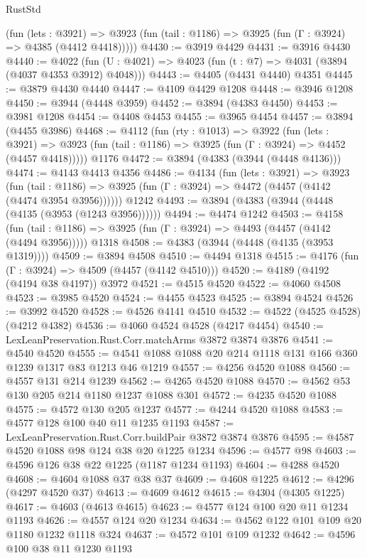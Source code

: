 \begin{lexlean}{RustStd}
\begin{coremodule}
{\begin{coremodule}
{{{{{{{{{{{{{{{{{{{{{{{{{{{{{{{{      (fun (lets : @3921) =>
      @3923 (fun (tail : @1186) => @3925 (fun (Γ : @3924) => @4385 (@4412 @4418)))))
@4430 := @3919 @4429
@4431 := @3916 @4430
@4440 := @4022 (fun (U : @4021) => @4023 (fun (t : @7) => @4031 (@3894 (@4037 @4353 @3912) @4048)))
@4443 := @4405 (@4431 @4440) @4351
@4445 := @3879 @4430 @4440
@4447 := @4109 @4429 @1208
@4448 := @3946 @1208
@4450 := @3944 (@4448 @3959)
@4452 := @3894 (@4383 @4450)
@4453 := @3981 @1208
@4454 := @4408 @4453
@4455 := @3965 @4454
@4457 := @3894 (@4455 @3986)
@4468 := @4112
    (fun (rty : @1013) =>
    @3922
      (fun (lets : @3921) =>
      @3923 (fun (tail : @1186) => @3925 (fun (Γ : @3924) => @4452 (@4457 @4418)))))
    @1176
@4472 := @3894 (@4383 (@3944 (@4448 @4136)))
@4474 := @4143 @4413 @4356
@4486 := @4134
    (fun (lets : @3921) =>
    @3923
      (fun (tail : @1186) => @3925 (fun (Γ : @3924) => @4472 (@4457 (@4142 (@4474 @3954 @3956))))))
    @1242
@4493 := @3894 (@4383 (@3944 (@4448 (@4135 (@3953 (@1243 @3956))))))
@4494 := @4474 @1242
@4503 := @4158
    (fun (tail : @1186) => @3925 (fun (Γ : @3924) => @4493 (@4457 (@4142 (@4494 @3956)))))
    @1318
@4508 := @4383 (@3944 (@4448 (@4135 (@3953 @1319))))
@4509 := @3894 @4508
@4510 := @4494 @1318
@4515 := @4176 (fun (Γ : @3924) => @4509 (@4457 (@4142 @4510)))
@4520 := @4189 (@4192 (@4194 @38 @4197)) @3972
@4521 := @4515 @4520
@4522 := @4060 @4508
@4523 := @3985 @4520
@4524 := @4455 @4523
@4525 := @3894 @4524
@4526 := @3992 @4520
@4528 := @4526 @4141 @4510
@4532 := @4522 (@4525 @4528) (@4212 @4382)
@4536 := @4060 @4524 @4528 (@4217 @4454)
@4540 := LexLeanPreservation.Rust.Corr.matchArms @3872 @3874 @3876
@4541 := @4540 @4520
@4555 := @4541 @1088 @1088 @20 @214 @1118 @131 @166 @360 @1239 @1317 @83 @1213 @46 @1219
@4557 := @4256 @4520 @1088
@4560 := @4557 @131 @214 @1239
@4562 := @4265 @4520 @1088
@4570 := @4562 @53 @130 @205 @214 @1180 @1237 @1088 @301
@4572 := @4235 @4520 @1088
@4575 := @4572 @130 @205 @1237
@4577 := @4244 @4520 @1088
@4583 := @4577 @128 @100 @40 @11 @1235 @1193
@4587 := LexLeanPreservation.Rust.Corr.buildPair @3872 @3874 @3876
@4595 := @4587 @4520 @1088 @98 @124 @38 @20 @1225 @1234
@4596 := @4577 @98
@4603 := @4596 @126 @38 @22 @1225 (@1187 @1234 @1193)
@4604 := @4288 @4520
@4608 := @4604 @1088 @37 @38 @37
@4609 := @4608 @1225
@4612 := @4296 (@4297 @4520 @37)
@4613 := @4609 @4612
@4615 := @4304 (@4305 @1225)
@4617 := @4603 (@4613 @4615)
@4623 := @4577 @124 @100 @20 @11 @1234 @1193
@4626 := @4557 @124 @20 @1234
@4634 := @4562 @122 @101 @109 @20 @1180 @1232 @1118 @324
@4637 := @4572 @101 @109 @1232
@4642 := @4596 @100 @38 @11 @1230 @1193
}}}}}}}}}}}}}}}}}}}}}}}}}}}}}}}}
\end{coremodule}}
\end{coremodule}
\end{lexlean}
